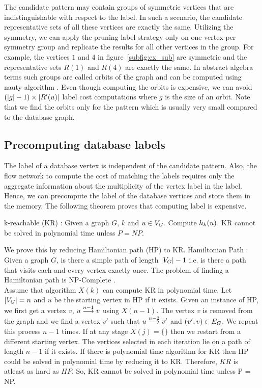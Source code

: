  The candidate pattern may contain groups of
symmetric vertices that are indistinguishable with respect to the \khop label.
In such a scenario, the candidate representative sets of all these vertices are
exactly the same. Utilizing the symmetry, we can apply the pruning label strategy only on
one vertex per symmetry group and replicate the results for all other vertices
in the group. For example, the vertices $1$ and $4$ in
figure~\ref{subfig:ex_sub} are symmetric and the representative sets $R(1)$
and $R(4)$ are exactly the same.  In abstract algebra terms such  groups are
called orbits of the graph and can be computed using nauty algorithm
\cite{nauty}. 
Even
though computing the orbits is expensive, we can avoid $ (|g|-1) \times |\CR|$
\ncl label cost computations where $g$ is the size of an orbit. Note that
we find the orbits only for the pattern which is usually very small compared
to the database graph.

\subsection{Precomputing database \khop labels} The \khop label of a database
vertex is independent of the candidate pattern.
Also, the flow network to compute the cost of matching the \khop labels requires
only the aggregate information about the multiplicity of the vertex label in the
\khop label.
Hence, we can precompute the \khop label of the database vertices and store them
in the memory. The following theorem proves that computing \khop label is
expensive.

\begin{thm} k-reachable (KR) : Given a graph $G$, $k$ and $u \in \vg$. Compute
    $\khopl{k}{u}$.  KR cannot be solved in polynomial time unless $P =
    NP$.

\begin{myproof} We prove this by reducing Hamiltonian path (HP) to KR.
    Hamiltonian Path : Given a graph $G$, is there a simple path of length
    $|\vg|-1$ i.e. is there a path that visits each and every vertex exactly
    once. The problem of finding a Hamiltonian path is 
    NP-Complete \cite{npcomplete}.\\ Assume that algorithm $X(k)$ can
    compute KR in polynomial time. Let $|\vg| = n$ and $u$ be the starting
    vertex in HP if it exists.  Given an instance of HP, we first get a vertex
    $v$, $\kpath{u}{v}{n-1}$ using $X(n-1)$. The vertex $v$ is removed from the
    graph and we find a vertex $v'$ such that $\kpath{u}{v'}{n-2}$ and $(v', v)
    \in \eg$. We repeat this process $n-1$ times. If at any stage $X(j) = \{\}$
    then we restart from a different starting vertex. The vertices selected in
    each iteration lie on a path of length $n-1$ if it exists. If there is
    polynomial time algorithm for KR then HP could be solved in polynomial time
    by reducing it to KR. Therefore, $KR$ is atleast as hard as $HP$.
    So, KR cannot be solved in polynomial time unless
    P = NP.
\end{myproof}
\end{thm}

